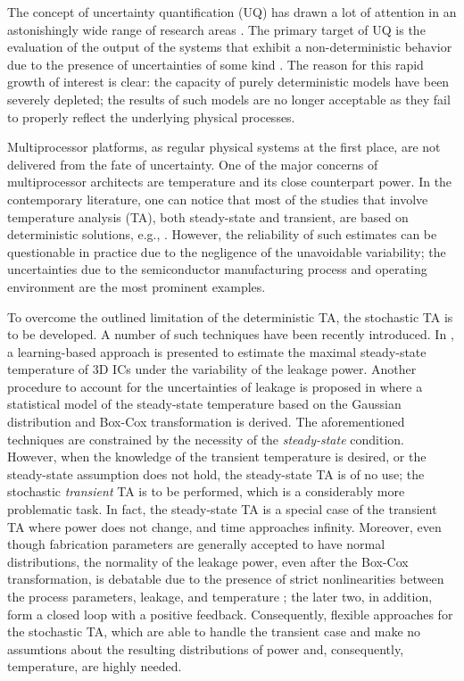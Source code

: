 The concept of uncertainty quantification (UQ) has drawn a lot of attention in an astonishingly wide range of research areas \cite{xiu2009}. The primary target of UQ is the evaluation of the output of the systems that exhibit a non-deterministic behavior due to the presence of uncertainties of some kind \cite{eldred2009}. The reason for this rapid growth of interest is clear: the capacity of purely deterministic models have been severely depleted; the results of such models are no longer acceptable as they fail to properly reflect the underlying physical processes.

Multiprocessor platforms, as regular physical systems at the first place, are not delivered from the fate of uncertainty. One of the major concerns of multiprocessor architects are temperature and its close counterpart power. In the contemporary literature, one can notice that most of the studies that involve temperature analysis (TA), both steady-state and transient, are based on deterministic solutions, e.g., \cite{ukhov2012}. However, the reliability of such estimates can be questionable in practice due to the negligence of the unavoidable variability; the uncertainties due to the semiconductor manufacturing process and operating environment are the most prominent examples.

To overcome the outlined limitation of the deterministic TA, the stochastic TA is to be developed. A number of such techniques have been recently introduced. In \cite{juan2011}, a learning-based approach is presented to estimate the maximal steady-state temperature of 3D ICs under the variability of the leakage power. Another procedure to account for the uncertainties of leakage is proposed in \cite{juan2012} where a statistical model of the steady-state temperature based on the Gaussian distribution and Box-Cox transformation \cite{box1964} is derived. The aforementioned techniques are constrained by the necessity of the \emph{steady-state} condition. However, when the knowledge of the transient temperature is desired, or the steady-state assumption does not hold, the steady-state TA is of no use; the stochastic \emph{transient} TA is to be performed, which is a considerably more problematic task. In fact, the steady-state TA is a special case of the transient TA where power does not change, and time approaches infinity. Moreover, even though fabrication parameters are generally accepted to have normal distributions, the normality of the leakage power, even after the Box-Cox transformation, is debatable due to the presence of strict nonlinearities between the process parameters, leakage, and temperature \cite{liu2007}; the later two, in addition, form a closed loop with a positive feedback. Consequently, flexible approaches for the stochastic TA, which are able to handle the transient case and make no assumtions about the resulting distributions of power and, consequently, temperature, are highly needed.

